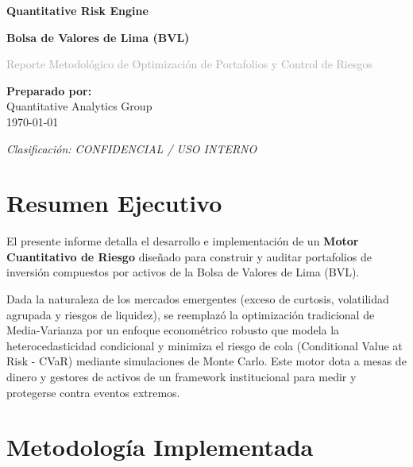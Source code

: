 \documentclass[11pt,a4paper]{article}
\begin{document}
\begin{titlepage}
    \centering
    \vspace*{4cm}
    
    {\Huge \textcolor{bankblue}{\textbf{Quantitative Risk Engine}} \par}
    \vspace{0.5cm}
    {\Large \textbf{Bolsa de Valores de Lima (BVL)} \par}
    
    \vspace{2cm}
    {\Large \textcolor{darkgray}{Reporte Metodológico de Optimización de Portafolios y Control de Riesgos} \par}
    
    \vspace{4cm}
    \textbf{Preparado por:}\\
    Quantitative Analytics Group\\
    \vspace{0.5cm}
    \today
    \vfill
    
    \begin{flushleft}
    \small \textit{Clasificación: CONFIDENCIAL / USO INTERNO}
    \end{flushleft}
\end{titlepage}

\tableofcontents
\newpage

\section{Resumen Ejecutivo}
El presente informe detalla el desarrollo e implementación de un \textbf{Motor Cuantitativo de Riesgo} diseñado para construir y auditar portafolios de inversión compuestos por activos de la Bolsa de Valores de Lima (BVL). 

Dada la naturaleza de los mercados emergentes (exceso de curtosis, volatilidad agrupada y riesgos de liquidez), se reemplazó la optimización tradicional de Media-Varianza por un enfoque econométrico robusto que modela la heterocedasticidad condicional y minimiza el riesgo de cola (Conditional Value at Risk - CVaR) mediante simulaciones de Monte Carlo. Este motor dota a mesas de dinero y gestores de activos de un framework institucional para medir y protegerse contra eventos extremos.

\section{Metodología Implementada}
\end{document}
